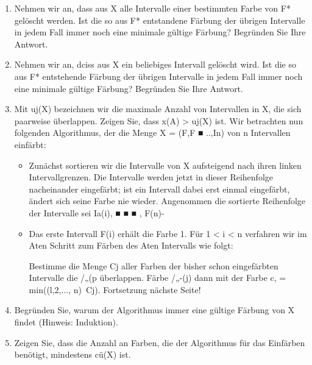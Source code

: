 \documentclass{bschlangaul-aufgabe}
\begin{document}
\begin{enumerate}


\item Nehmen wir an, dass aus X alle Intervalle einer bestimmten Farbe
von F* gelöscht werden. Ist die so aus F* entstandene Färbung der
übrigen Intervalle in jedem Fall immer noch eine minimale gültige
Färbung? Begründen Sie Ihre Antwort.


\item Nehmen wir an, dciss aus X ein beliebiges Intervall gelöscht wird.
Ist die so aus F* entstehende Färbung der übrigen Intervalle in jedem
Fall immer noch eine minimale gültige Färbung? Begründen Sie Ihre
Antwort.


\item Mit uj(X) bezeichnen wir die maximale Anzahl von Intervallen in X,
die sich paarweise überlappen. Zeigen Sie, dass x(A) > uj(X) ist. Wir
betrachten nun folgenden Algorithmus, der die Menge X = (F,F ■ ..,In)
von n Intervallen einfärbt:

\begin{itemize}
\item Zunächst sortieren wir die Intervalle von X aufsteigend nach ihren
linken Intervallgrenzen. Die Intervalle werden jetzt in dieser
Reihenfolge nacheinander eingefärbt; ist ein Intervall dabei erst einmal
eingefärbt, ändert sich seine Farbe nie wieder. Angenommen die sortierte
Reihenfolge der Intervalle sei Ia(i), ■ ■ ■ , F(n)-

\item Das erste Intervall F(i) erhält die Farbe 1. Für 1 < i < n
verfahren wir im Aten Schritt zum Färben des Aten Intervalls wie folgt:

Bestimme die Menge Cj aller Farben der bisher schon eingefärbten
Intervalle die /„(p überlappen. Färbe /„-(j) dann mit der Farbe c, =
min((l,2,..., n)\ Cj). Fortsetzung nächste Seite!
\end{itemize}


\item Begründen Sie, warum der Algorithmus immer eine gültige Färbung
von X findet (Hinweis: Induktion).


\item Zeigen Sie, dass die Anzahl an Farben, die der Algorithmus für das
Einfärben benötigt, mindestens cü(X) ist.


\end{enumerate}
\end{document}
